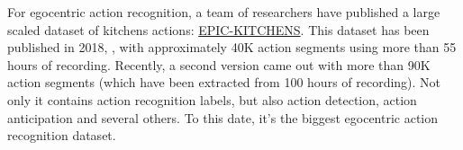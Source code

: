 \documentclass[12pt, a4paper]{report}
\begin{document}
	For egocentric action recognition, a team of researchers have published a large scaled dataset of kitchens actions: \href{https://epic-kitchens.github.io/2021}{EPIC-KITCHENS}.
	This dataset has been published in 2018, \cite{damen_18}, with approximately 40K action segments using more than 55 hours of recording.
	Recently, a second version came out with more than 90K action segments (which have been extracted from 100 hours of recording).
	Not only it contains action recognition labels, but also action detection, action anticipation and several others.
	To this date, it's the biggest egocentric action recognition dataset.

	
	
	
	\makeutbmbackcover{}
\end{document}
